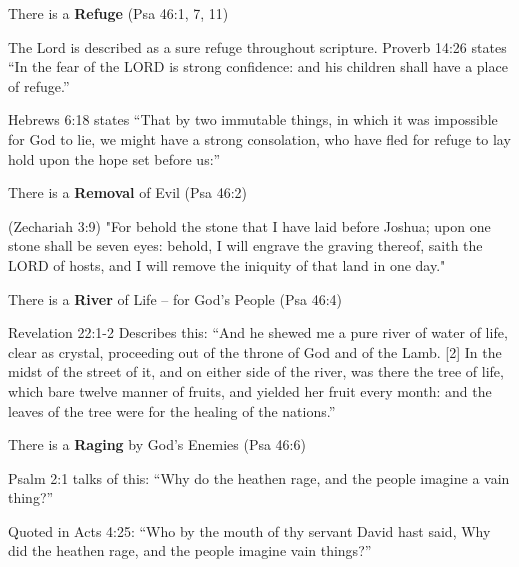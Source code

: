 \begin{compactenum}[I.][8]
	\item There is a \textbf{Refuge} (Psa 46:1, 7, 11)
	\begin{compactenum}[A.]
		\item The Lord is described as a sure refuge throughout scripture. Proverb 14:26 states ``In the fear of the LORD is strong confidence: and his children shall have a place of refuge.''
		\item Hebrews 6:18 states ``That by two immutable things, in which it was impossible for God to lie, we might have a strong consolation, who have fled for refuge to lay hold upon the hope set before us:''
	\end{compactenum}
	\item There is a \textbf{Removal} of Evil (Psa 46:2)
	\begin{compactenum}[A.]
		\item (Zechariah 3:9) "For behold the stone that I have laid before Joshua; upon one stone shall be seven eyes: behold, I will engrave the graving thereof, saith the LORD of hosts, and I will remove the iniquity of that land in one day."
	\end{compactenum}
	\item There is a \textbf{River} of Life -- for God's People (Psa 46:4)
	\begin{compactenum}[A.]
		\item Revelation 22:1-2 Describes this: ``And he shewed me a pure river of water of life, clear as crystal, proceeding out of the throne of God and of the Lamb. [2] In the midst of the street of it, and on either side of the river, was there the tree of life, which bare twelve manner of fruits, and yielded her fruit every month: and the leaves of the tree were for the healing of the nations.''
	\end{compactenum}
	\item There is a \textbf{Raging} by God's Enemies (Psa 46:6)
	\begin{compactenum}[A.]
		\item Psalm 2:1 talks of this: ``Why do the heathen rage, and the people imagine a vain thing?''
		\item Quoted in Acts 4:25: ``Who by the mouth of thy servant David hast said, Why did the heathen rage, and the people imagine vain things?''

\end{compactenum}
\end{compactenum}
